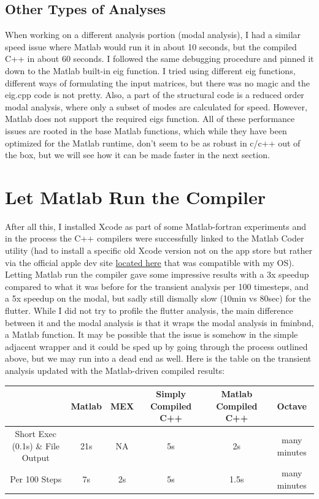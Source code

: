 \documentclass{article}
\begin{document}
\subsection{Other Types of Analyses}

When working on a different analysis portion (modal analysis), I had a similar speed issue where Matlab would run it in about 10 seconds, but the compiled C++ in about 60 seconds.  I followed the same debugging procedure and pinned it down to the Matlab built-in eig function.  I tried using different eig functions, different ways of formulating the input matrices, but there was no magic and the eig.cpp code is not pretty.  Also, a part of the structural code is a reduced order modal analysis, where only a subset of modes are calculated for speed.  However, Matlab does not support the required eigs function.  All of these performance issues are rooted in the base Matlab functions, which while they have been optimized for the Matlab runtime, don't seem to be as robust in c/c++ out of the box, but we will see how it can be made faster in the next section.


\section{Let Matlab Run the Compiler}

After all this, I installed Xcode as part of some Matlab-fortran experiments and in the process the C++ compilers were successfully linked to the Matlab Coder utility (had to install a specific old Xcode version not on the app store but rather via the official apple dev site \href{https://developer.apple.com/download/}{located here} that was compatible with my OS).  Letting Matlab run the compiler gave some impressive results with a 3x speedup compared to what it was before for the transient analysis per 100 timesteps, and a 5x speedup on the modal, but sadly still dismally slow (10min vs 80sec) for the flutter. While I did not try to profile the flutter analysis, the main difference between it and the modal analysis is that it wraps the modal analysis in fminbnd, a Matlab function.  It may be possible that the issue is somehow in the simple adjacent wrapper and it could be sped up by going through the process outlined above, but we may run into a dead end as well.  Here is the table on the transient analysis updated with the Matlab-driven compiled results:

\begin{center}
\begin{tabular}{|c| c c c c c|}
\hline 
& Matlab & MEX & Simply Compiled C++ & Matlab Compiled C++ & Octave \\
\hline
Short Exec (0.1s) \& File Output & 21s & NA & 5s & 2s & many minutes \\
\hline
Per 100 Steps & 7s & 2s & 5s & 1.5s & many minutes \\
\hline
\end{tabular}
\end{center}
\end{document}
